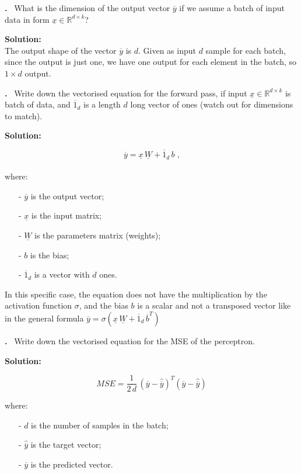\documentclass[a4paper,12pt]{article} %
\newcounter{problem}
\newcounter{solution}
\newcommand\Problem{%
	\stepcounter{problem}%
	\textbf{\theproblem.}~%
	\setcounter{solution}{0}%
}
\newcommand\Solution{%
	\textbf{Solution:}\\%
}
\begin{document}
	\Problem{What is the dimension of the output vector $\overline{y}$ if we 
	assume a batch of input data in form $\underline{x} \in \mathbb{R}^{d 
	\times k}$?}\medskip
	
	\Solution{The output shape of the vector $\overline{y}$ is $d$. Given as 
	input $d$ sample for each batch, since the output is just one, we have one 
	output for each 
	element in the batch, so $1 \times d$ output.}\vspace{0.4cm}
	
	\Problem{Write down the vectorised equation for the forward pass, if input 
	$\underline{x} \in \mathbb{R}^{d \times k}$ is batch of data, and 
	$\overline{1}_d$ is a length $d$ long vector of ones (watch out for 
	dimensions to match).}\medskip
	
	\Solution{
		\begin{equation}
		\overline{y}=\underline{x} \, \underline{W}+\overline{1}_d \, b \mbox{ 
		,}
		\end{equation}
		\\where:
		\begin{itemize}
			\item[-] $\overline{y}$ is the output vector; 
			\item[-] $\underline{x}$ is the input matrix;
			\item[-] $\underline{W}$ is the parameters matrix (weights);
			\item[-] ${b}$ is the bias;
			\item[-] $\overline{1}_d$ is a vector  with $d$ ones.
		\end{itemize}
		In this specific case, the equation does not have the multiplication by 
		the activation function $\sigma$, and the bias $b$ is a scalar and not 
		a transposed vector like in the general formula $\overline{y} = 
		\sigma(\underline{x} \, \underline{W} + \overline{1}_d \, 
		\overline{b}^T)$
	}\vspace{0.4cm}
	
	\Problem{Write down the vectorised equation for the MSE of the 
	perceptron.}\medskip
	
	\Solution{	
		\begin{equation}
		MSE = \frac{1}{2 \, d} \, 
		(\overline{y}-\hat{\overline{y}})^T(\overline{y}-\hat{\overline{y}})
		\end{equation}
	
		where:
		\begin{itemize}
			\item[-] $d$ is the number of samples in the batch; 
			\item[-] $\hat{\overline{y}}$ is the target vector; 
			\item[-] ${\overline{y}}$ is the predicted vector.
		\end{itemize}}\vspace{0.4cm}
	
\end{document}
